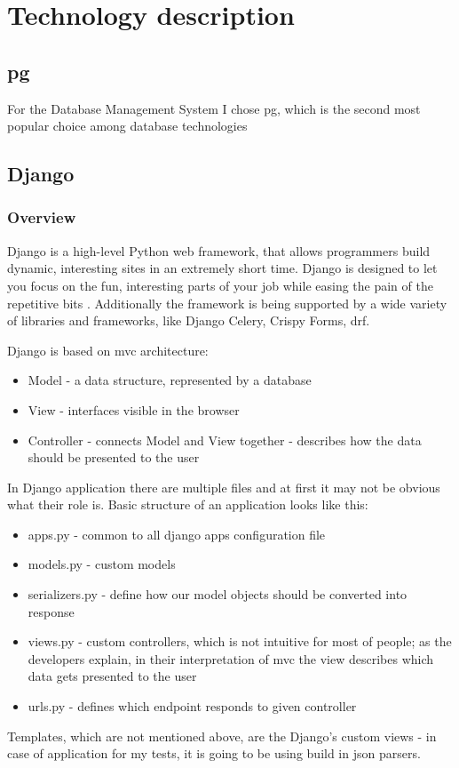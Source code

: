 
\chapter{Technology description}


\section{\acrlong{pg}}

For the Database Management System I chose \acrlong{pg}, which is the second most popular choice among database technologies %

\section{Django}

\subsection{Overview}
Django is a high-level Python web framework, that allows programmers build dynamic, interesting sites in an extremely short time. Django is designed to let you focus on the fun, interesting parts of your job while easing the pain of the repetitive bits \cite{djangobook}. Additionally the framework is being supported by a wide variety of libraries and frameworks, like Django Celery, Crispy Forms, \acrfull{drf}.

Django is based on \acrshort{mvc} architecture:
\begin{itemize}
    \item Model - a data structure, represented by a database
    \item View - interfaces visible in the browser
    \item Controller - connects Model and View together - describes how the data should be presented to the user
\end{itemize}
In Django application there are multiple files and at first it may not be obvious what their role is. Basic structure of an application looks like this:
\begin{itemize}
    \item apps.py - common to all django apps configuration file
    \item models.py - custom models
    \item serializers.py - define how our model objects should be converted into response
    \item views.py - custom controllers, which is not intuitive for most of people; as the developers explain, in their interpretation of \acrshort{mvc} the view describes which data gets presented to the user \cite{djangoWhyViews}
    \item urls.py - defines which endpoint responds to given controller
\end{itemize}
Templates, which are not mentioned above, are the Django's custom views - in case of application for my tests, it is going to be using build in json parsers.


